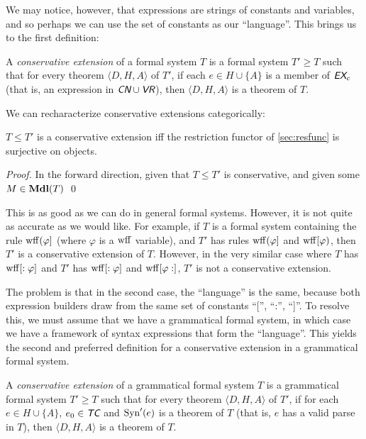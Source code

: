 \documentclass[runningheads,a4paper]{llncs}
\newcommand{\cn}{\textit{\textsf{CN}}} %
\newcommand{\vr}{\textit{\textsf{VR}}} %
\newcommand{\ex}{\textit{\textsf{EX}}} %
\newcommand{\tc}{\textit{\textsf{TC}}} %
\newcommand{\ang}[1]{\langle#1\rangle}
\newcommand{\vph}{\varphi}
\newcommand{\syn}{{\rm Syn}}
\begin{document}
We may notice, however, that expressions are strings of constants and variables, and so perhaps we can use the set of constants as our ``language''. This brings us to the first definition:

\begin{definition}\label{def:cext}
A {\em conservative extension} of a formal system $T$ is a formal system $T'\ge T$ such that for every theorem $\ang{D,H,A}$ of $T'$, if each $e\in H\cup\{A\}$ is a member of $\ex_c$ (that is, an expression in $\cn\cup\vr$), then $\ang{D,H,A}$ is a theorem of $T$.
\end{definition}

We can recharacterize conservative extensions categorically:

\begin{theorem}
$T\le T'$ is a conservative extension iff the restriction functor of \autoref{sec:resfunc} is surjective on objects. 
\end{theorem}
\begin{proof}
In the forward direction, given that $T\le T'$ is conservative, and given some $M\in{\bf Mdl}(T)$
\qed\end{proof}

This is as good as we can do in general formal systems. However, it is not quite as accurate as we would like. For example, if $T$ is a formal system containing the rule ${\rm wff}(\vph]$ (where $\vph$ is a $\rm wff$ variable), and $T'$ has rules ${\rm wff}(\vph]$ and ${\rm wff}[\vph)$, then $T'$ is a conservative extension of $T$. However, in the very similar case where $T$ has ${\rm wff}[:\vph]$ and $T'$ has ${\rm wff}[:\vph]$ and ${\rm wff}[\vph:]$, $T'$ is not a conservative extension.

The problem is that in the second case, the ``language'' is the same, because both expression builders draw from the same set of constants ``['', ``:'', ``]''. To resolve this, we must assume that we have a grammatical formal system, in which case we have a framework of syntax expressions that form the ``language''. This yields the second and preferred definition for a conservative extension in a grammatical formal system.

\begin{definition}\label{def:gcext}
A {\em conservative extension} of a grammatical formal system $T$ is a grammatical formal system $T'\ge T$ such that for every theorem $\ang{D,H,A}$ of $T'$, if for each $e\in H\cup\{A\}$, $e_0\in\tc$ and $\syn'(e)$ is a theorem of $T$ (that is, $e$ has a valid parse in $T$), then $\ang{D,H,A}$ is a theorem of $T$.
\end{definition}
\end{document}
